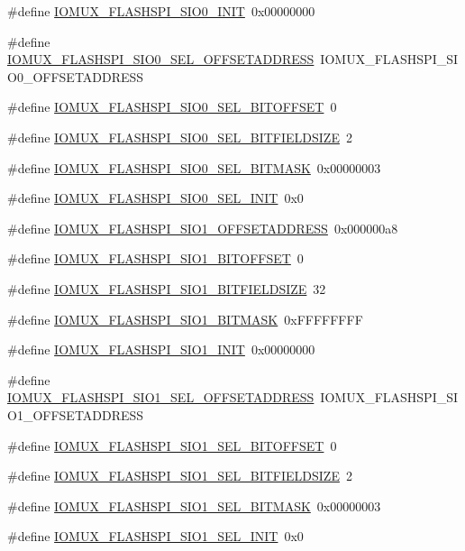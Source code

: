 \begin{DoxyCompactItemize}
\#define \hyperlink{a00560_a617b75a330de00deadf3886ac74d6fd5}{IOMUX\_\-FLASHSPI\_\-SIO0\_\-INIT}~0x00000000
\item 
\#define \hyperlink{a00560_aea3fae8aa11081de97054aa45d046caf}{IOMUX\_\-FLASHSPI\_\-SIO0\_\-SEL\_\-OFFSETADDRESS}~IOMUX\_\-FLASHSPI\_\-SIO0\_\-OFFSETADDRESS
\item 
\#define \hyperlink{a00560_a8db82627a2f3d8ad11b4416fbc25db49}{IOMUX\_\-FLASHSPI\_\-SIO0\_\-SEL\_\-BITOFFSET}~0
\item 
\#define \hyperlink{a00560_a4c1e49bb93eed9d7d92588bba44d8f34}{IOMUX\_\-FLASHSPI\_\-SIO0\_\-SEL\_\-BITFIELDSIZE}~2
\item 
\#define \hyperlink{a00560_a6e634c9ef87d823ed5dafa77ddc3ee70}{IOMUX\_\-FLASHSPI\_\-SIO0\_\-SEL\_\-BITMASK}~0x00000003
\item 
\#define \hyperlink{a00560_ac3651bf37c83cd4a64ef60fba335469e}{IOMUX\_\-FLASHSPI\_\-SIO0\_\-SEL\_\-INIT}~0x0
\item 
\#define \hyperlink{a00560_ae7fce9c498d363c0ed6ee2eab8e2336e}{IOMUX\_\-FLASHSPI\_\-SIO1\_\-OFFSETADDRESS}~0x000000a8
\item 
\#define \hyperlink{a00560_aaa912b364873a8ed511628885974b004}{IOMUX\_\-FLASHSPI\_\-SIO1\_\-BITOFFSET}~0
\item 
\#define \hyperlink{a00560_a69eedc6f05387c8ad4c2a0a29844aaa1}{IOMUX\_\-FLASHSPI\_\-SIO1\_\-BITFIELDSIZE}~32
\item 
\#define \hyperlink{a00560_a18941b59832ecbb8b864d36116c464df}{IOMUX\_\-FLASHSPI\_\-SIO1\_\-BITMASK}~0xFFFFFFFF
\item 
\#define \hyperlink{a00560_ae10e87ea907c49fd860aa065521d6013}{IOMUX\_\-FLASHSPI\_\-SIO1\_\-INIT}~0x00000000
\item 
\#define \hyperlink{a00560_aa907732cc4e1d35dfafc5482beca0875}{IOMUX\_\-FLASHSPI\_\-SIO1\_\-SEL\_\-OFFSETADDRESS}~IOMUX\_\-FLASHSPI\_\-SIO1\_\-OFFSETADDRESS
\item 
\#define \hyperlink{a00560_a85ba3fd50322915855eb84b0abe21a69}{IOMUX\_\-FLASHSPI\_\-SIO1\_\-SEL\_\-BITOFFSET}~0
\item 
\#define \hyperlink{a00560_ae8d8d639388a2847523d251b279e547d}{IOMUX\_\-FLASHSPI\_\-SIO1\_\-SEL\_\-BITFIELDSIZE}~2
\item 
\#define \hyperlink{a00560_a94947867ef01c6e79e84c52bf86f557c}{IOMUX\_\-FLASHSPI\_\-SIO1\_\-SEL\_\-BITMASK}~0x00000003
\item 
\#define \hyperlink{a00560_a253949f6e23382c23f40fafad191411a}{IOMUX\_\-FLASHSPI\_\-SIO1\_\-SEL\_\-INIT}~0x0
\item 

\end{DoxyCompactItemize}
